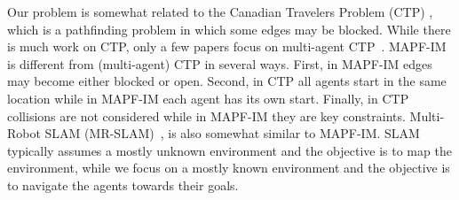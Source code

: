 \documentclass[letterpaper]{article} %
\def\
UrlFont{\rm}  %
\newcommand{\roni}[1]{\textbf{[\color{orange}RONI:#1]}}
\theoremstyle{definition}
\begin{document}
Our problem is somewhat related to the Canadian Travelers Problem (CTP) \cite{zhang2013k}, which is a pathfinding problem in which some edges may be blocked. While there is much work on CTP, only a few papers focus on multi-agent CTP~\cite{shiri2017online,shiri2019randomized}.
MAPF-IM is different from (multi-agent) CTP in several ways. First, in MAPF-IM edges may become either blocked or open. Second, in CTP all agents start in the same location while in MAPF-IM each agent has its own start.
Finally, in CTP collisions are not considered while in MAPF-IM they are key constraints.
Multi-Robot SLAM (MR-SLAM)~\cite{burgard2000collaborative,kshirsagar2018survey,abdulgalil2019multi}, is also somewhat similar to MAPF-IM. SLAM typically assumes a mostly unknown environment and the objective is to map the environment, while we focus on a mostly known environment and the objective is to navigate the agents towards their goals.
\end{document}
